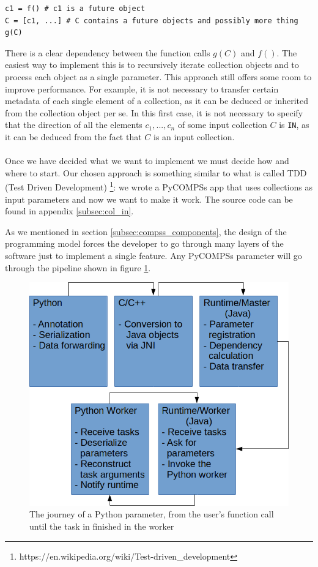 \begin{verbatim}
c1 = f() # c1 is a future object
C = [c1, ...] # C contains a future objects and possibly more thing
g(C)
\end{verbatim}
There is a clear dependency between the function calls $g(C)$ and $f()$. The easiest way to implement this is to recursively iterate collection objects and to process each object as a single parameter. This approach still offers some room to improve performance. For example, it is not necessary to transfer certain metadata of each single element of a collection, as it can be deduced or inherited from the collection object per se. In this first case, it is not necessary to specify that the direction of all the elements $c_1, ..., c_n$ of some input collection $C$ is \verb|IN|, as it can be deduced from the fact that $C$ is an input collection.\\
\\
Once we have decided what we want to implement we must decide how and where to start. Our chosen approach is something similar to what is called TDD (Test Driven Development) \footnote{https://en.wikipedia.org/wiki/Test-driven\_development}: we wrote a PyCOMPSs app that uses collections as input parameters and now we want to make it work. The source code can be found in appendix \ref{subsec:col_in}.

As we mentioned in section \ref{subsec:compss_components}, the design of the programming model forces the developer to go through many layers of the software just to implement a single feature. Any PyCOMPSs parameter will go through the pipeline shown in figure \ref{fig:parameter_pipeline}.

\begin{figure}[ht!]
\centering
\includegraphics[scale = 0.5]{figures/parameter_pipeline.png}
\caption{The journey of a Python parameter, from the user's function call until the task in finished in the worker}
\label{fig:parameter_pipeline}
\end{figure}

